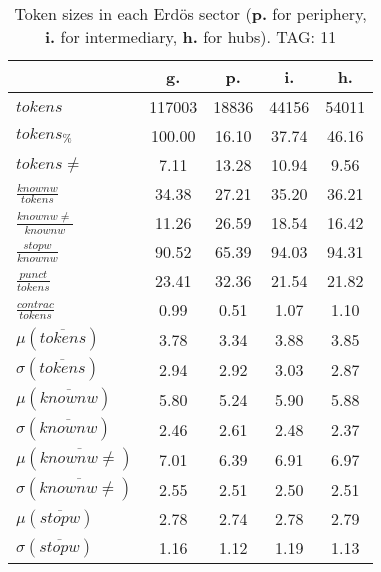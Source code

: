 \begin{table}[h!]
\begin{center}
\begin{tabular}{| l || c | c | c | c |}\hline
 & {\bf g.} & {\bf p.} & {\bf i.} & {\bf h.} \\\hline\hline
$tokens$ & 117003  & 18836  & 44156  & 54011 \\
$tokens_{\%}$ & 100.00  & 16.10  & 37.74  & 46.16 \\
$tokens \neq$ & 7.11  & 13.28  & 10.94  & 9.56 \\\hline
$\frac{knownw}{tokens}$ & 34.38  & 27.21  & 35.20  & 36.21 \\
$\frac{knownw \neq}{knownw}$ & 11.26  & 26.59  & 18.54  & 16.42 \\\hline
$\frac{stopw}{knownw}$ & 90.52  & 65.39  & 94.03  & 94.31 \\
$\frac{punct}{tokens}$ & 23.41  & 32.36  & 21.54  & 21.82 \\
$\frac{contrac}{tokens}$ & 0.99  & 0.51  & 1.07  & 1.10 \\\hline\hline
$\mu(\overline{tokens})$ & 3.78  & 3.34  & 3.88  & 3.85 \\
$\sigma(\overline{tokens})$ & 2.94  & 2.92  & 3.03  & 2.87 \\\hline
$\mu(\overline{knownw})$ & 5.80  & 5.24  & 5.90  & 5.88 \\
$\sigma(\overline{knownw})$ & 2.46  & 2.61  & 2.48  & 2.37 \\\hline
$\mu(\overline{knownw \neq})$ & 7.01  & 6.39  & 6.91  & 6.97 \\
$\sigma(\overline{knownw \neq})$ & 2.55  & 2.51  & 2.50  & 2.51 \\\hline
$\mu(\overline{stopw})$ & 2.78  & 2.74  & 2.78  & 2.79 \\
$\sigma(\overline{stopw})$ & 1.16  & 1.12  & 1.19  & 1.13 \\\hline
\end{tabular}
\caption{Token sizes in each Erd\"os sector ({{\bf p.}} for periphery, {{\bf i.}} for intermediary, {{\bf h.}} for hubs). TAG: 11}
\end{center}
\end{table}